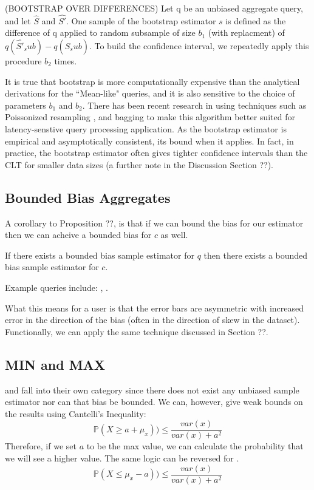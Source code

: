 \begin{proposition} (BOOTSTRAP OVER DIFFERENCES) Let q be an unbiased aggregate query, and let $\hat{S}$ and $\hat{S'}$.
One sample of the bootstrap estimator $s$ is defined as the difference of q applied to random subsample of size $b_1$ (with replacment) of $q(\hat{S'}_sub) - q(\hat{S}_sub)$.
To build the confidence interval, we repeatedly apply this procedure $b_2$ times.
\end{proposition}

It is true that bootstrap is more computationally expensive than the analytical derivations for the ``Mean-like" queries, and it is also sensitive to the choice of parameters $b_1$ and $b_2$.
There has been recent research in using techniques such as Poissonized resampling \cite{agarwalknowing}, and bagging \cite{DBLP:conf/kdd/KleinerTASJ13} to make this algorithm better suited for latency-senstive query processing application.
As the bootstrap estimator is empirical and asymptotically consistent, its bound when it applies. 
In fact, in practice, the bootstrap estimator often gives tighter confidence intervals than the CLT for smaller data sizes (a further note in the Discussion Section ??).

\subsection{Bounded Bias Aggregates}
A corollary to Proposition ??, is that if we can bound the bias for our estimator then we can acheive a bounded bias for $c$ as well.
\begin{corollary}
If there exists a bounded bias sample estimator for $q$ then there exists a bounded bias sample estimator for $c$.
\end{corollary}
Example queries include: \medfunc, \percfunc.

What this means for a user is that the error bars are asymmetric with increased error in the direction of the bias (often in the direction of skew in the dataset).
Functionally, we can apply the same technique discussed in Section ??. 

\subsection{MIN and MAX}
\minfunc and \maxfunc fall into their own category since there does not exist any unbiased sample estimator nor can that bias be bounded.
We can, however, give weak bounds on the results using Cantelli's Inequality:
\[
\mathbb{P}(X \ge a + \mu_x )) \le \frac{var(x)}{var(x) + a^2}
\]
Therefore, if we set $a$ to be the max value, we can calculate the probability that we will see a higher value. The same logic can be reversed for \minfunc.
\[
\mathbb{P}(X \le \mu_x - a )) \le \frac{var(x)}{var(x) + a^2}
\]

